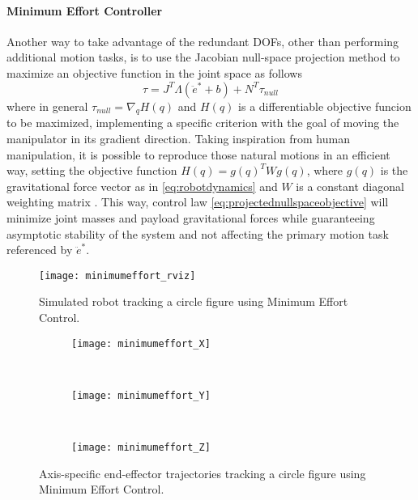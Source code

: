 \paragraph{Minimum Effort Controller}
Another way to take advantage of the redundant DOFs, other than performing additional motion tasks, is to use the Jacobian null-space projection method to maximize an objective function in the joint space as follows
\begin{equation}
\tau = J^T\Lambda(\ddot{e}^* + b) + N^T\tau_{null}
\label{eq:projectednullspaceobjective}
\end{equation}
where in general $\tau_{null} = \nabla_{q}H(q)$ and $H(q)$ is a differentiable objective funcion to be maximized, implementing a specific criterion with the goal of moving the manipulator in its gradient direction. Taking inspiration from human manipulation, it is possible to reproduce those natural motions in an efficient way, setting the objective function $H(q) = g(q)^{T}Wg(q)$, where $g(q)$ is the gravitational force vector as in \eqref{eq:robotdynamics} and $W$ is a constant diagonal weighting matrix \cite{ajoudani13}. This way, control law \eqref{eq:projectednullspaceobjective} will minimize joint masses and payload gravitational forces while guaranteeing asymptotic stability of the system and not affecting the primary motion task referenced by $\ddot{e}^*$.

\begin{figure}[H]
\centering
\texttt{[image: minimumeffort\_rviz]}
\caption{Simulated robot tracking a circle figure using Minimum Effort Control.}
\end{figure}
\begin{figure}[H]
	\centering
	\begin{subfigure}[t]{\textwidth}
		\texttt{[image: minimumeffort\_X]}
	\end{subfigure}
	\\
	\begin{subfigure}[t]{\textwidth}
		\texttt{[image: minimumeffort\_Y]}
	\end{subfigure}
	\\
	\begin{subfigure}[t]{\textwidth}
		\texttt{[image: minimumeffort\_Z]}
	\end{subfigure}
	\caption{Axis-specific end-effector trajectories tracking a circle figure using Minimum Effort Control.}
\end{figure}

